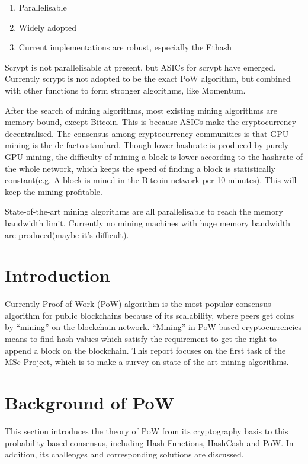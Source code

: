 \documentclass[11pt]{article}
\begin{document}
\begin{enumerate}
\item Parallelisable
\item Widely adopted
\item Current implementations are robust, especially the Ethash
\end{enumerate}

Scrypt is not parallelisable at present, but ASICs for scrypt have emerged. Currently scrypt is not adopted to be the exact PoW algorithm, but combined with other functions to form stronger algorithms, like Momentum.

After the search of mining algorithms, most existing mining algorithms are memory-bound, except Bitcoin. This is because ASICs make the cryptocurrency decentralised. The consensus among cryptocurrency communities is that GPU mining is the de facto standard. Though lower hashrate is produced by purely GPU mining, the difficulty of mining a block is lower according to the hashrate of the whole network, which keeps the speed of finding a block is statistically constant(e.g. A block is mined in the Bitcoin network per 10 minutes). This will keep the mining profitable.

State-of-the-art mining algorithms are all parallelisable to reach the memory bandwidth limit. Currently no mining machines with huge memory bandwidth are produced(maybe it's difficult).

\section{Introduction}

Currently Proof-of-Work (PoW) algorithm is the most popular consensus algorithm for public blockchains because of its scalability, where peers get coins by ``mining'' on the blockchain network. ``Mining'' in PoW based cryptocurrencies means to find hash values which satisfy the requirement to get the right to append a block on the blockchain. This report focuses on the first task of the MSc Project, which is to make a survey on state-of-the-art mining algorithms.

\section{Background of PoW}

This section introduces the theory of PoW from its cryptography basis to this probability based consensus, including Hash Functions, HashCash and PoW. In addition, its challenges and corresponding solutions are discussed.
\end{document}
